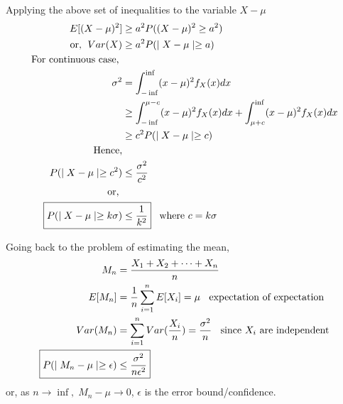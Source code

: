 \documentclass[11pt, a4paper]{article}
\begin{document}
    Applying the above set of inequalities to the variable $X - \mu$
    \begin{align*}
        E[(X - \mu)^{2}] &\geq a^{2} P((X - \mu)^{2} \geq a^{2}) \\
        \text{or, \;} Var(X) &\geq a^{2} P(\mid X - \mu \mid \geq a)\\
        \text{For continuous case, }\\
        \sigma^{2} &= \int_{-\inf}^{\inf} (x-\mu)^{2}f_{X}(x) dx\\
                  &\geq \int_{-\inf}^{\mu-c} (x-\mu)^{2}f_{X}(x)dx + \int_{\mu+c}^{\inf} (x-\mu)^{2}f_{X}(x)dx\\
                  &\geq c^{2} P(\mid X - \mu \mid \geq c)\\
        \text{Hence,}\\
        P(\mid X - \mu \mid \geq c^{2}) &\leq \frac{\sigma^{2}}{c^{2}}\\
        \text{or, } \\
        \Aboxed{P(\mid X - \mu \mid \geq k\sigma) &\leq \frac{1}{k^{2}}}\text{\;\;\;where $c = k\sigma$}
    \end{align*}

    Going back to the problem of estimating the mean,
    \begin{align*}
        M_{n} &= \frac{X_{1} + X_{2} + \cdots + X_{n}}{n} \\
        E[M_{n}] &= \frac{1}{n} \sum_{i=1}^{n} E[X_{i}] = \mu \text{\;\; expectation of expectation} \\
        Var(M_{n}) &= \sum_{i=1}^{n} Var(\frac{X_{i}}{n}) = \frac{\sigma^{2}}{n} \text{\;\; since $X_{i}$ are independent} \\
        \Aboxed{P(\mid M_{n} - \mu \mid \geq \epsilon) &\leq \frac{\sigma^{2}}{n\epsilon^{2}}}
    \end{align*}
    or, as $n \rightarrow \inf,\; M_{n} - \mu \rightarrow 0$, $\epsilon$ is the error bound/confidence.

\end{document}
